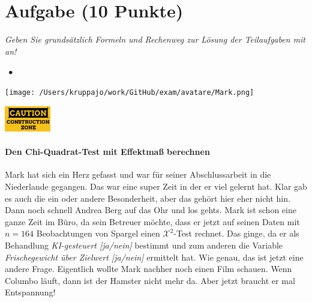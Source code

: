 \documentclass[a4paper, 9pt]{scrartcl}\usepackage[]{graphicx}\usepackage[]{xcolor}
\begin{document}
\section{Aufgabe \hfill (10 Punkte)}

\textit{Geben Sie grundsätzlich Formeln und Rechenweg zur Lösung der Teilaufgaben mit an!} \\[1Ex]
 

 
\ifcollection
\begin{flushright}
\tiny\vspace{-3Ex}
\textbf{\examinhaltstart}
\exammodulestat $\;\bullet$
\exammodulestatbbv 
\vspace{-4Ex}
\end{flushright}
\begin{minipage}[t]{0.5\textwidth}
\texttt{[image: /Users/kruppajo/work/GitHub/exam/avatare/Mark.png]}
\end{minipage}
\begin{minipage}[t]{0.5\textwidth}
\hfill
\href{https://youtu.be/-Kva5wc5Elw}{\includegraphics[width = 2cm]{img/caution}}
\end{minipage}
\vspace{-3Ex}
\fi



\ifcollection
\paragraph{Den Chi-Quadrat-Test mit Effektmaß berechnen}
\fi

Mark hat sich ein Herz gefasst und war für seiner Abschlussarbeit in die Niederlande gegangen. Das war eine super Zeit in der er viel gelernt hat. Klar gab es auch die ein oder andere Besonderheit, aber das gehört hier eher nicht hin. Dann noch schnell Andrea Berg auf das Ohr und los gehts. Mark ist schon eine ganze Zeit im Büro, da sein Betreuer möchte, dass er jetzt auf seinen Daten mit $n = 164$ Beobachtungen von Spargel einen $\mathcal{X}^2$-Test rechnet. Das ginge, da er als Behandlung \textit{KI-gesteuert [ja/nein]} bestimmt und zum anderen die Variable \textit{Frischegewicht über Zielwert [ja/nein]} ermittelt hat. Wie genau, das ist jetzt eine andere Frage. Eigentlich wollte Mark nachher noch einen Film schauen. Wenn Columbo läuft, dann ist der Hamster nicht mehr da. Aber jetzt braucht er mal Entspannung!
\end{document}

